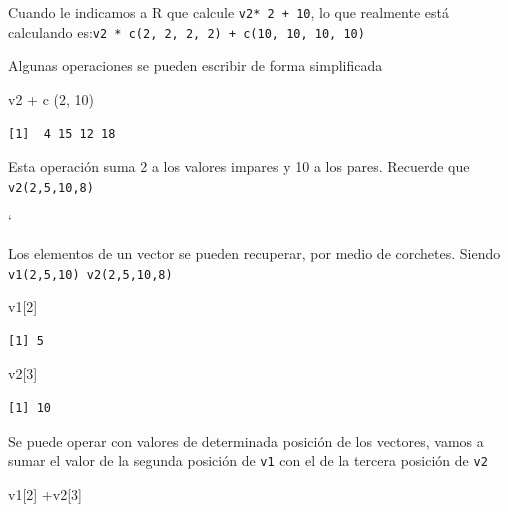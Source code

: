 \documentclass[
  letterpaper,
  DIV=11,
  numbers=noendperiod]{scrreprt}
\newenvironment{Shaded}{\begin{snugshade}}{\end{snugshade}}
\newcommand{\DecValTok}[1]{\textcolor[rgb]{0.68,0.00,0.00}{#1}}
\newcommand{\FunctionTok}[1]{\textcolor[rgb]{0.28,0.35,0.67}{#1}}
\newcommand{\NormalTok}[1]{\textcolor[rgb]{0.00,0.23,0.31}{#1}}
\newcommand{\SpecialCharTok}[1]{\textcolor[rgb]{0.37,0.37,0.37}{#1}}
\begin{document}
Cuando le indicamos a R que calcule \texttt{v2*\ 2\ +\ 10}, lo que
realmente está calculando
es:\texttt{v2\ *\ c(2,\ 2,\ 2,\ 2)\ +\ c(10,\ 10,\ 10,\ 10)}

Algunas operaciones se pueden escribir de forma simplificada

\begin{Shaded}
\begin{Highlighting}[]
\NormalTok{v2 }\SpecialCharTok{+} \FunctionTok{c}\NormalTok{ (}\DecValTok{2}\NormalTok{, }\DecValTok{10}\NormalTok{)}
\end{Highlighting}
\end{Shaded}

\begin{verbatim}
[1]  4 15 12 18
\end{verbatim}

Esta operación suma 2 a los valores impares y 10 a los pares. Recuerde
que \texttt{v2(2,5,10,8)}

`

Los elementos de un vector se pueden recuperar, por medio de corchetes.
Siendo \texttt{v1(2,5,10)\ v2(2,5,10,8)}

\begin{Shaded}
\begin{Highlighting}[]
\NormalTok{v1[}\DecValTok{2}\NormalTok{]}
\end{Highlighting}
\end{Shaded}

\begin{verbatim}
[1] 5
\end{verbatim}

\begin{Shaded}
\begin{Highlighting}[]
\NormalTok{v2[}\DecValTok{3}\NormalTok{]}
\end{Highlighting}
\end{Shaded}

\begin{verbatim}
[1] 10
\end{verbatim}

Se puede operar con valores de determinada posición de los vectores,
vamos a sumar el valor de la segunda posición de \texttt{v1} con el de
la tercera posición de \texttt{v2}

\begin{Shaded}
\begin{Highlighting}[]
\NormalTok{v1[}\DecValTok{2}\NormalTok{] }\SpecialCharTok{+}\NormalTok{v2[}\DecValTok{3}\NormalTok{]}
\end{Highlighting}
\end{Shaded}
\end{document}
